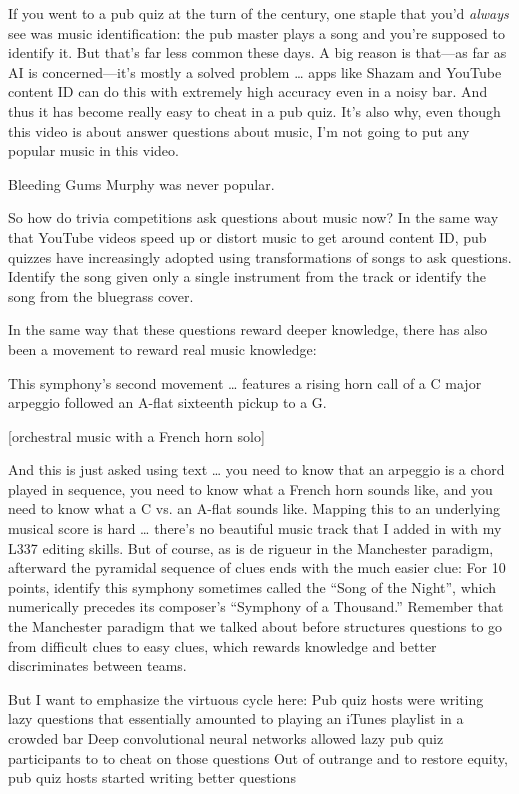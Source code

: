 If you went to a pub quiz at the turn of the century, one staple that you’d \emph{always} see was music identification: the pub master plays a song and you’re supposed to identify it.  But that’s far less common these days.  A big reason is that—as far as AI is concerned—it’s mostly a solved problem … apps like Shazam and YouTube content ID can do this with extremely high accuracy even in a noisy bar.  And thus it has become really easy to cheat in a pub quiz.  It’s also why, even though this video is about answer questions about music, I’m not going to put any popular music in this video.

Bleeding Gums Murphy was never popular.


So how do trivia competitions ask questions about music now?  In the same way that YouTube videos speed up or distort music to get around content ID, pub quizzes have increasingly adopted using transformations of songs to ask questions.  Identify the song given only a single instrument from the track or identify the song from the bluegrass cover.

In the same way that these questions reward deeper knowledge, there has also been a movement to reward real music knowledge:  

This symphony’s second movement … features a rising horn call of a C major arpeggio followed an A-flat sixteenth pickup to a G. 

[orchestral music with a French horn solo]


And this is just asked using text … you need to know that an arpeggio is a chord played in sequence, you need to know what a French horn sounds like, and you need to know what a C vs. an A-flat sounds like.  Mapping this to an underlying musical score is hard … there’s no beautiful music track that I added in with my L337 editing skills.  But of course, as is de rigueur in the Manchester paradigm, afterward the pyramidal sequence of clues ends with the much easier clue:
For 10 points, identify this symphony sometimes called the “Song of the Night”, which numerically precedes its composer’s “Symphony of a Thousand.”
Remember that the Manchester paradigm that we talked about before structures questions to go from difficult clues to easy clues, which rewards knowledge and better discriminates between teams.

But I want to emphasize the virtuous cycle here:
Pub quiz hosts were writing lazy questions that essentially amounted to playing an iTunes playlist in a crowded bar
Deep convolutional neural networks allowed lazy pub quiz participants to to cheat on those questions
Out of outrange and to restore equity, pub quiz hosts started writing better questions

